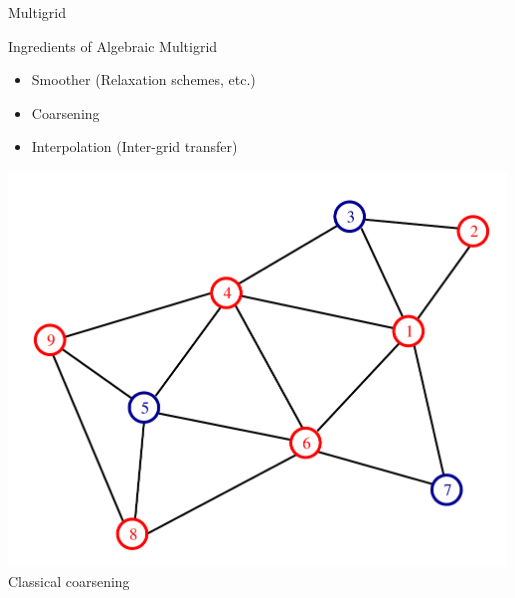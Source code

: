 


\begin{frame}{Multigrid}

 \begin{minipage}{0.6\textwidth}
 \begin{block}{Ingredients of Algebraic Multigrid}
  \begin{itemize}
   \item Smoother (Relaxation schemes, etc.)
   \item Coarsening
   \item Interpolation (Inter-grid transfer)
  \end{itemize}
 \end{block}
 \end{minipage}

 \begin{minipage}{0.48\textwidth}
  \begin{center}
  \includegraphics[width=0.99\textwidth]{figures/graph-rs.pdf} \\
    Classical coarsening
  \end{center}
 \end{minipage}
 \begin{minipage}{0.48\textwidth}
  \begin{center}

\end{center}
\end{minipage}
\end{frame}
